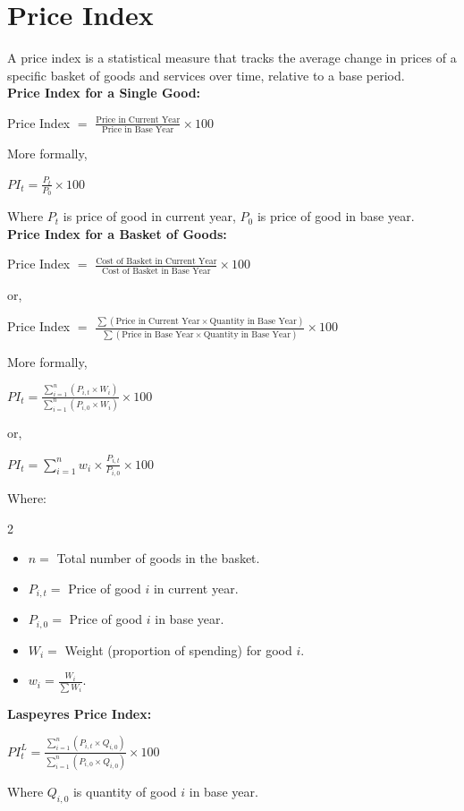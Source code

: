 \documentclass[a4paper, 11pt]{article}
\begin{document}
\section{Price Index}
A price index is a statistical measure that tracks the average change in prices of a specific basket of goods and services over time, relative to a base period.\\[6pt]
\textbf{Price Index for a Single Good:}
\begin{center}
    Price Index $=$ $\frac{\text{Price in Current Year}}{\text{Price in Base Year}} \times 100$
\end{center}
More formally,
\begin{center}
    $PI_t=\frac{P_t}{P_0} \times 100$
\end{center}
Where $P_t$ is price of good in current year, $P_0$ is price of good in base year.\\[6pt]
\textbf{Price Index for a Basket of Goods:}
\begin{center}
    Price Index $=$ $\frac{\text{Cost of Basket in Current Year}}{\text{Cost of Basket in Base Year}} \times 100$
\end{center}
or,
\begin{center}
    Price Index $=$ $\frac{\sum (\text{Price in Current Year} \times \text{Quantity in Base Year})}{\sum (\text{Price in Base Year} \times \text{Quantity in Base Year})} \times 100$
\end{center}
More formally,
\begin{center}
    $PI_t=\frac{\sum_{i=1}^n (P_{i,t} \times W_i)}{\sum_{i=1}^n  (P_{i,0} \times W_i)} \times 100$
\end{center}
or,
\begin{center}
    $PI_t=\sum_{i=1}^n w_i \times \frac{P_{i,t}}{P_{i,0}} \times 100$
\end{center}
Where:
\begin{multicols}{2}
    \begin{itemize}
        \item $n=$ Total number of goods in the basket.
        \item $P_{i,t}=$ Price of good $i$ in current year.
        \item $P_{i,0}=$ Price of good $i$ in base year.
        \item $W_i=$ Weight (proportion of spending) for good $i$.
        \item $w_i=\frac{W_i}{\sum W_i}$.
    \end{itemize}
\end{multicols}
\textbf{Laspeyres Price Index:}
\begin{center}
    $PI_t^L=\frac{\sum_{i=1}^n (P_{i,t} \times Q_{i,0})}{\sum_{i=1}^n  (P_{i,0} \times Q_{i,0})} \times 100$
\end{center}
Where $Q_{i,0}$ is quantity of good $i$ in base year.
\end{document}
